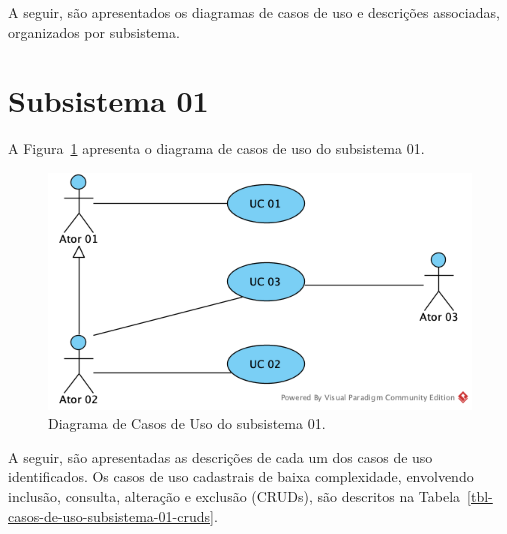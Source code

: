 A seguir, são apresentados os diagramas de casos de uso e descrições associadas, organizados por subsistema.



\section{Subsistema 01}
\label{sec-casos-de-uso-subsistema-01}

A Figura~\ref{fig-casos-de-uso-subsistema-01} apresenta o diagrama de casos de uso do subsistema 01.

\begin{figure}[h!]
	\centering
	\includegraphics[width=.7\textwidth]{figuras/fig-casos-de-uso-subsistema-01.png}
	\caption{Diagrama de Casos de Uso do subsistema 01.}
	\label{fig-casos-de-uso-subsistema-01}
\end{figure}

A seguir, são apresentadas as descrições de cada um dos casos de uso identificados. Os casos de uso cadastrais de baixa complexidade, envolvendo inclusão, consulta, alteração e exclusão (CRUDs), são descritos na Tabela~\ref{tbl-casos-de-uso-subsistema-01-cruds}.

